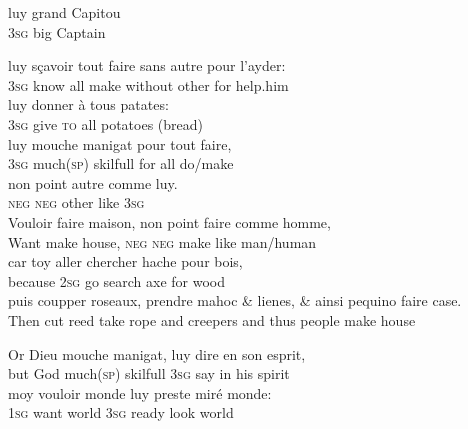 \documentclass[output=paper,colorlinks,citecolor=brown]{langscibook}
\begin{document}
\ex \label{ex:bakker:14b}
\gll luy grand Capitou\footnotemark{}\\
3\textsc{sg} big Captain\\

\ex \label{ex:bakker:14c}
\gll luy sçavoir tout faire sans autre pour l'ayder:\\
3\textsc{sg} know all make without other for help.him\\

\ex \label{ex:bakker:14d}
\gll luy donner à tous patates:\\
3\textsc{sg} give \textsc{to} all potatoes (bread)\\

\ex \label{ex:bakker:14e}
\gll luy mouche manigat pour tout faire,\\
3\textsc{sg} much(\textsc{sp}) skilfull for all do/make\\

\ex \label{ex:bakker:14f}
\gll non point autre comme luy.\\
\textsc{neg neg} other like 3\textsc{sg}\\

\ex \label{ex:bakker:14g}
\gll Vouloir faire maison, non point faire comme homme,\\
Want make house, \textsc{neg} \textsc{neg} make like man/human\\

\ex \label{ex:bakker:14h}
\gll car toy aller chercher hache pour bois,\\
because 2\textsc{sg} go search axe for wood\\

\ex \label{ex:bakker:14i}
\gll puis coupper roseaux, prendre mahoc\footnotemark{} \& lienes, \& ainsi pequino faire case.\\
Then cut reed take rope and creepers and thus people make house\\

\ex \label{ex:bakker:14j}
\gll Or Dieu mouche manigat, luy dire en son esprit,\\
but God much(\textsc{sp}) skilfull 3\textsc{sg} say in his spirit\\

\ex \label{ex:bakker:14k}
\gll moy vouloir monde luy preste miré monde:\\
1\textsc{sg} want world 3\textsc{sg} ready look world\\
\end{document}
